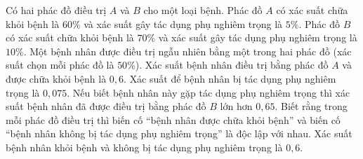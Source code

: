 \begin{ex}
Có hai phác đồ điều trị $A$ và $B$ cho một loại bệnh. Phác đồ $A$ có xác suất chữa khỏi bệnh là $60\%$ và xác suất gây tác dụng phụ nghiêm trọng là $5\%$. Phác đồ $B$ có xác suất chữa khỏi bệnh là $70\%$ và xác suất gây tác dụng phụ nghiêm trọng là $10\%$. Một bệnh nhân được điều trị ngẫu nhiên bằng một trong hai phác đồ (xác suất chọn mỗi phác đồ là $50\%$).
\choiceTF
{Xác suất bệnh nhân điều trị bằng phác đồ $A$ và được chữa khỏi bệnh là $0{,}6$.}
{\True Xác suất để bệnh nhân bị tác dụng phụ nghiêm trọng là $0{,}075$.}
{\True Nếu biết bệnh nhân này gặp tác dụng phụ nghiêm trọng thì xác suất bệnh nhân đã được điều trị bằng phác đồ $B$ lớn hơn $0{,}65$.}
{\True Biết rằng trong mỗi phác đồ điều trị thì biến cố ``bệnh nhân được chữa khỏi bệnh'' và biến cố ``bệnh nhân không bị tác dụng phụ nghiêm trọng'' là độc lập với nhau. Xác suất bệnh nhân khỏi bệnh và không bị tác dụng phụ nghiêm trọng là $0{,}6$.}
\end{ex}
